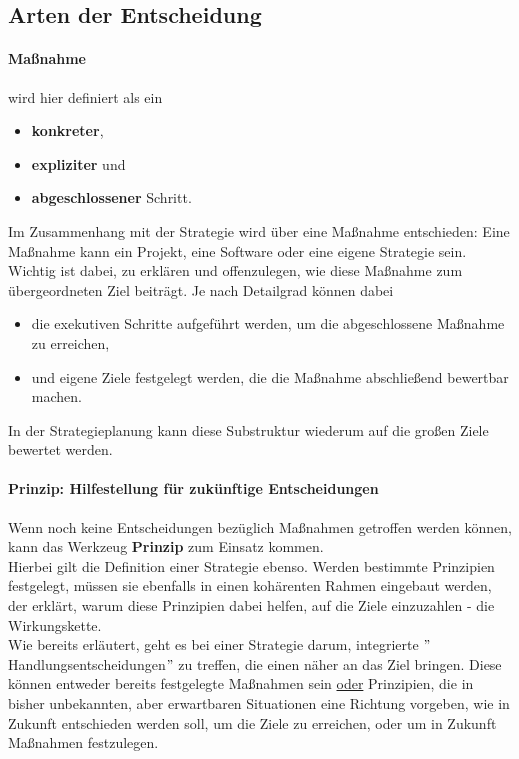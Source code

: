 \subsection{Arten der Entscheidung}


\paragraph{Maßnahme} wird hier definiert als ein

\begin{itemize}
	\item \textbf{konkreter},
	\item \textbf{expliziter} und
	\item \textbf{abgeschlossener} Schritt.
\end{itemize}

Im Zusammenhang mit der Strategie wird über eine Maßnahme entschieden: Eine Maßnahme kann ein Projekt, eine Software oder eine eigene Strategie sein. Wichtig ist dabei, zu erklären und offenzulegen, wie diese Maßnahme zum übergeordneten Ziel beiträgt. Je nach Detailgrad können dabei

\begin{itemize}
	\item die exekutiven Schritte aufgeführt werden, um die abgeschlossene Maßnahme zu erreichen,
	\item und eigene Ziele festgelegt werden, die die Maßnahme abschließend bewertbar machen.
\end{itemize}

In der Strategieplanung kann diese Substruktur wiederum auf die großen Ziele bewertet werden.

\paragraph{Prinzip: Hilfestellung für zukünftige Entscheidungen} \label{Rubic:Prinzip}

Wenn noch keine Entscheidungen bezüglich Maßnahmen getroffen werden können, kann das Werkzeug \textbf{Prinzip} zum Einsatz kommen.\\

Hierbei gilt die Definition einer Strategie ebenso. Werden bestimmte Prinzipien festgelegt, müssen sie ebenfalls in einen kohärenten Rahmen eingebaut werden, der erklärt, warum diese Prinzipien dabei helfen, auf die Ziele einzuzahlen - die Wirkungskette.\\

Wie bereits erläutert, geht es bei einer Strategie darum, integrierte $"$Handlungsentscheidungen$"$ zu treffen, die einen näher an das Ziel bringen. Diese können entweder bereits festgelegte Maßnahmen sein \underline{oder} Prinzipien, die in bisher unbekannten, aber erwartbaren Situationen eine Richtung vorgeben, wie in Zukunft entschieden werden soll, um die Ziele zu erreichen, oder um in Zukunft Maßnahmen festzulegen.

